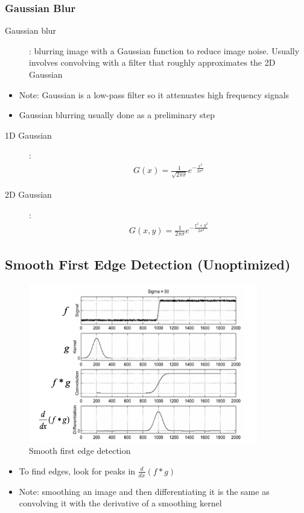 \documentclass[letterpaper,12pt]{article}
\begin{document}
\subsubsection{Gaussian Blur}
\begin{description}
 \item[Gaussian blur]: blurring image with a Gaussian function to reduce image noise. Usually involves convolving with a filter that roughly approximates the 2D Gaussian
\end{description}
\begin{itemize}
 \item Note: Gaussian is a low-pass filter so it attenuates high frequency signals
 \item Gaussian blurring usually done as a preliminary step
\end{itemize}
\begin{description}
 \item[1D Gaussian]:
       \begin{align}
        G(x) = \frac{1}{\sqrt{2\pi\sigma}}e^{-\frac{x^2}{2\sigma^2}}
       \end{align}
 \item[2D Gaussian]:
       \begin{align}
        G(x,y) = \frac{1}{2\pi\sigma}e^{-\frac{x^2+y^2}{2\sigma^2}}
       \end{align}
\end{description}


\subsection{Smooth First Edge Detection (Unoptimized)}
\begin{figure}[H]
 \centering
 \includegraphics[width=10cm]{images/smooth_first_inefficient.png}
 \caption{Smooth first edge detection}
\end{figure}
\begin{itemize}
 \item To find edges, look for peaks in $\frac{d}{dx} (f*g)$
 \item Note: smoothing an image and then differentiating it is the same as convolving it with the derivative of a smoothing kernel
\end{itemize}
\end{document}
